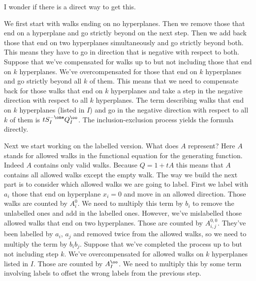 I wonder if there is a direct way to get this.

We first start with walks ending on no hyperplanes. Then we remove those that end on a hyperplane and go strictly beyond on the next step. Then we add back those that end on two hyperplanes simultaneously and go strictly beyond both. This means they have to go in direction that is negative with respect to both. Suppose that we've compensated for walks up to but not including those that end on $k$ hyperplanes. We've overcompensated for those that end on $k$ hyperplanes and go strictly beyond all $k$ of them. This means that we need to compensate back for those walks that end on $k$ hyperplanes and take a step in the negative direction with respect to all $k$ hyperplanes. The term describing walks that end on $k$ hyperplanes (listed in $I$) and go in the negative direction with respect to all $k$ of them is $tS_I^{-\one}Q_I^\oo$. The inclusion-exclusion process yields the formula directly.

Next we start working on the labelled version. What does $A$ represent? Here $A$ stands for allowed walks in the functional equation for the generating function. Indeed $A$ contains only valid walks. Because $Q = 1 + tA$ this means that $A$ contains all allowed walks except the empty walk. The way we build the next part is to consider which allowed walks we are going to label. First we label with $a_i$ those that end on hyperplane $x_i = 0$ and move in an allowed direction. Those walks are counted by $A_i^0$. We need to multiply this term by $b_i$ to remove the unlabelled ones and add in the labelled ones. However, we've mislabelled those allowed walks that end on two hyperplanes. Those are counted by $A_{i,j}^{0,0}$. They've been labelled by $a_i$, $a_j$ and removed twice from the allowed walks, so we need to multiply the term by $b_ib_j$. Suppose that we've completed the process up to but not including step $k$. We've overcompensated for allowed walks on $k$ hyperplanes listed in $I$. Those are counted by $A_I^\oo$. We need to multiply this by some term involving labels to offset the wrong labels from the previous step. 

